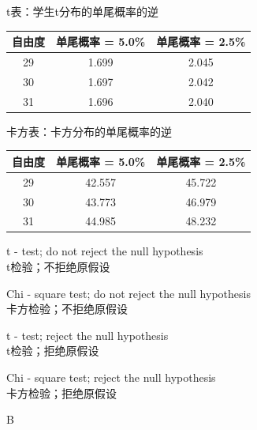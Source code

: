 \documentclass{article}
\newcounter{question} %
\begin{document}
\begin{question}
        t表：学生t分布的单尾概率的逆
        \begin{center}
        \begin{tabular}{|c|c|c|}
        \hline
        自由度 & 单尾概率 = 5.0\% & 单尾概率 = 2.5\% \\
        \hline
        29 & 1.699 & 2.045 \\
        \hline
        30 & 1.697 & 2.042 \\
        \hline
        31 & 1.696 & 2.040 \\
        \hline
        \end{tabular}
        \end{center}
        卡方表：卡方分布的单尾概率的逆
        \begin{center}
        \begin{tabular}{|c|c|c|}
        \hline
        自由度 & 单尾概率 = 5.0\% & 单尾概率 = 2.5\% \\
        \hline
        29 & 42.557 & 45.722 \\
        \hline
        30 & 43.773 & 46.979 \\
        \hline
        31 & 44.985 & 48.232 \\
        \hline
        \end{tabular}
        \end{center}
        \end{question}
        
        \begin{choices}
            \item t - test; do not reject the null hypothesis\\
            t检验；不拒绝原假设
            \item Chi - square test; do not reject the null hypothesis\\
            卡方检验；不拒绝原假设
            \item t - test; reject the null hypothesis\\
            t检验；拒绝原假设
            \item Chi - square test; reject the null hypothesis\\
            卡方检验；拒绝原假设
        \end{choices}
        
        \begin{correctanswer}
            B
        \end{correctanswer}
        
\end{document}
